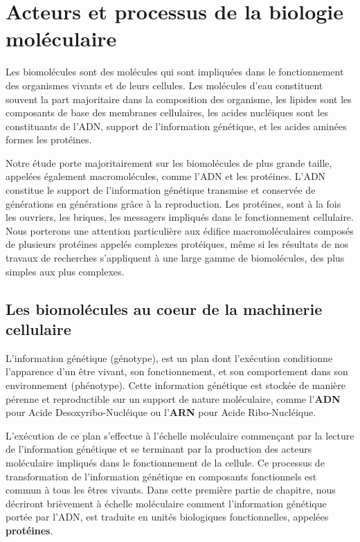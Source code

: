 \section{Acteurs et processus de la biologie moléculaire}

Les biomolécules sont des molécules qui sont impliquées dans le fonctionnement des organismes vivants et de leurs cellules. Les molécules d'eau constituent souvent la part majoritaire dans la composition des organisme, les lipides sont les composants de base des membranes cellulaires, les acides nucléiques sont les constituants de l'ADN, 
support de l'information génétique, et les acides aminées formes les protéines.

Notre étude porte majoritairement sur les biomolécules de plus grande taille, appelées également macromolécules, comme l'ADN et les protéines. L'ADN constitue le support de l'information génétique transmise et conservée de générations en générations grâce à la reproduction. Les protéines, sont à la fois les ouvriers, les briques, les messagers impliqués dans le fonctionnement cellulaire. Nous porterons une attention particulière aux  édifice macromoléculaires composés de plusieurs protéines appelés complexes protéiques, même si les résultats de nos travaux de recherches s'appliquent à une large gamme de biomolécules, des plus simples aux plus complexes.

\subsection{Les biomolécules au coeur de la machinerie cellulaire}

L'information génétique (génotype), est un plan dont l'exécution conditionne l'apparence d'un être vivant, son fonctionnement, et son comportement dans son environnement (phénotype). Cette information génétique est stockée de manière pérenne et reproductible sur un support de nature moléculaire, comme l'\textbf{ADN} pour Acide Desoxyribo-Nucléique ou l'\textbf{ARN} pour Acide Ribo-Nucléique.

L'exécution de ce plan s'effectue à l'échelle moléculaire commençant par la lecture de l'information génétique et se terminant par la production des acteurs moléculaire impliqués dans le fonctionnement de la cellule. Ce processus de transformation de l'information génétique en composants fonctionnels est commun à tous les êtres vivants. Dans cette première partie de chapitre, nous décriront brièvement à échelle moléculaire comment l'information génétique portée par l'ADN, est traduite en unités biologiques fonctionnelles, appelées \textbf{protéines}.

